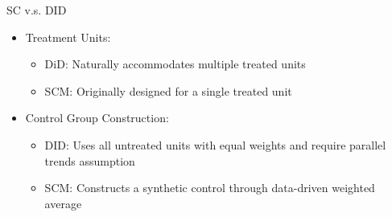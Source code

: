 \documentclass[hyperref={pdfpagelabels=false}]{beamer}
\begin{document}
\begin{frame}{SC v.s. DID}{}
	\begin{itemize}
	
		
		
			\item Treatment Units:
				\vspace{0.2cm}
		\begin{itemize}
			\item DiD: Naturally accommodates multiple treated units
				\vspace{0.2cm}
			\item SCM: Originally designed for a single treated unit 
            				\vspace{0.2cm}
		\end{itemize}
		
		
		\item Control Group Construction:
						\vspace{0.2cm}
		\begin{itemize}
			\item DID: Uses all untreated units with equal weights and require parallel trends assumption
								\vspace{0.2cm}
			\item SCM: Constructs a synthetic control through data-driven weighted average
		\end{itemize}
		\vspace{0.2cm}
		
		
		
		
		
		
	
	\end{itemize}
\end{frame}
\end{document}
